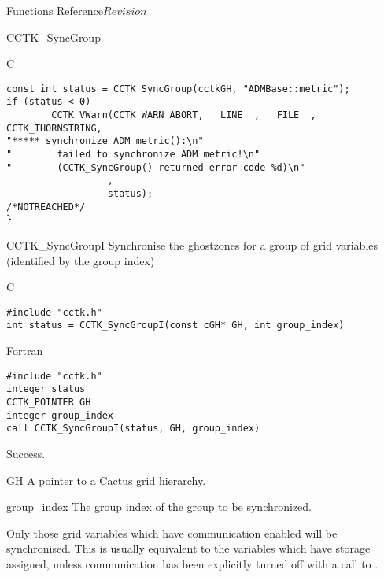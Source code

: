 \begin{cactuspart}{ Functions Reference}{}{$Revision$}
\begin{FunctionDescription}{CCTK\_SyncGroup}
\begin{ExampleSection}
\begin{Example}{C}
\begin{verbatim}
const int status = CCTK_SyncGroup(cctkGH, "ADMBase::metric");
if (status < 0)
        CCTK_VWarn(CCTK_WARN_ABORT, __LINE__, __FILE__, CCTK_THORNSTRING,
"***** synchronize_ADM_metric():\n"
"        failed to synchronize ADM metric!\n"
"        (CCTK_SyncGroup() returned error code %d)\n"
                  ,
                  status);                                 /*NOTREACHED*/
}
\end{verbatim}
\end{Example}
\end{ExampleSection}
\end{FunctionDescription}



\begin{FunctionDescription}{CCTK\_SyncGroupI}
\label{CCTK-SyncGroupI}
Synchronise the ghostzones for a group of grid variables
(identified by the group index)

\begin{SynopsisSection}
\begin{Synopsis}{C}
\begin{verbatim}
#include "cctk.h"
int status = CCTK_SyncGroupI(const cGH* GH, int group_index)
\end{verbatim}
\end{Synopsis}
\begin{Synopsis}{Fortran}
\begin{verbatim}
#include "cctk.h"
integer status
CCTK_POINTER GH
integer group_index
call CCTK_SyncGroupI(status, GH, group_index)
\end{verbatim}
\end{Synopsis}
\end{SynopsisSection}

\begin{ResultSection}
\begin{Result}{0}
Success.
\end{Result}
\end{ResultSection}

\begin{ParameterSection}
\begin{Parameter}{GH}
A pointer to a Cactus grid hierarchy.
\end{Parameter}
\begin{Parameter}{group\_index}
The group index of the group to be synchronized.
\end{Parameter}
\end{ParameterSection}

\begin{Discussion}
Only those grid variables which have communication enabled
will be synchronised. This is usually equivalent to the variables
which have storage assigned, unless communication has been explicitly
turned off with a call to .


\end{Discussion}
\end{FunctionDescription}
\end{cactuspart}
